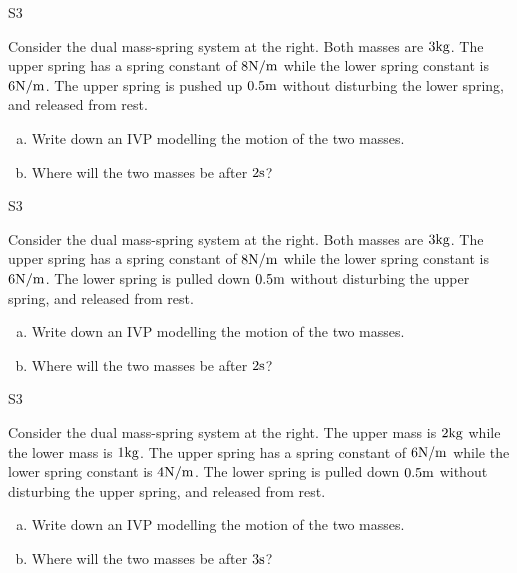 \begin{problem}{S3}
\begin{minipage}[t]{0.8\linewidth}
Consider the dual mass-spring system at the right.  Both masses are \(3 {\rm kg}\).  The upper spring has a spring constant of \( 8 {\rm N/m}\) while the lower spring constant is \(6 {\rm N/m}\).  The upper spring is pushed up \(0.5 {\rm m}\) without disturbing the lower spring, and released from rest. 
\begin{enumerate}[(a)]
\item Write down an IVP modelling the motion of the two masses.
\item Where will the two masses be after \(2 {\rm s}\)?
\end{enumerate}
\end{minipage}
\hfill
\springdoublemassQuiz[0.7]
\hfill
\end{problem}

\begin{problem}{S3}
\begin{minipage}[t]{0.8\linewidth}
Consider the dual mass-spring system at the right.  Both masses are \(3 {\rm kg}\).  The upper spring has a spring constant of \( 8 {\rm N/m}\) while the lower spring constant is \(6 {\rm N/m}\).  The lower spring is pulled down \(0.5 {\rm m}\) without disturbing the upper spring, and released from rest. 
\begin{enumerate}[(a)]
\item Write down an IVP modelling the motion of the two masses.
\item Where will the two masses be after \(2 {\rm s}\)?
\end{enumerate}
\end{minipage}
\hfill
\springdoublemassQuiz[0.7]
\hfill
\end{problem}

\begin{problem}{S3}
\begin{minipage}[t]{0.8\linewidth}
Consider the dual mass-spring system at the right.  The upper mass is \(2 {\rm kg}\) while the lower mass is \(1 {\rm kg}\).  The upper spring has a spring constant of \( 6 {\rm N/m}\) while the lower spring constant is \(4 {\rm N/m}\).  The lower spring is pulled down \(0.5 {\rm m}\) without disturbing the upper spring, and released from rest. 
\begin{enumerate}[(a)]
\item Write down an IVP modelling the motion of the two masses.
\item Where will the two masses be after \(3 {\rm s}\)?
\end{enumerate}
\end{minipage}
\hfill
\springdoublemassQuiz[0.7]
\hfill
\end{problem}

